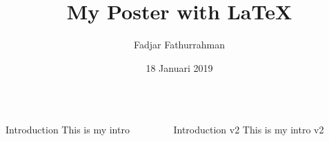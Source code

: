 \documentclass[final]{beamer}
\begin{document}
\title[ExamplePoster]{My Poster with \LaTeX}
\author[efefer]{Fadjar Fathurrahman}
\date{18 Januari 2019}
\maketitle

\begin{frame}


\begin{columns}[t]

\begin{column}{0.3\linewidth}

\begin{block}{\LARGE Introduction}
This is my intro
\end{block}

\end{column}


\begin{column}{0.3\linewidth}

\begin{block}{Introduction v2}
This is my intro v2
\end{block}

\end{column} %


\end{columns}

\end{frame}
\end{document}
